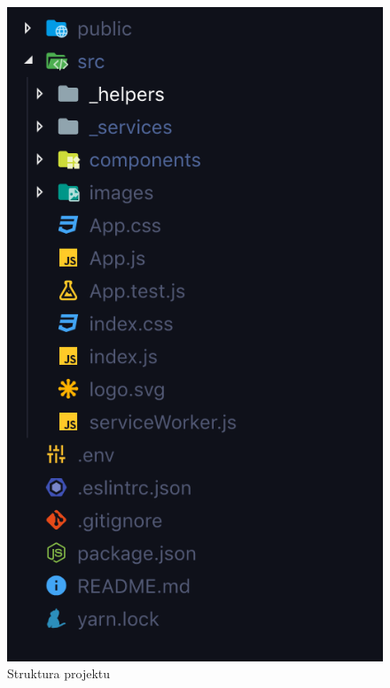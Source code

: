\documentclass[declaration,shortabstract]{iithesis}
\begin{document}
\begin{figure}
    \centering
    \includegraphics[]{images/forontend.png}  
    \caption{Struktura projektu}
    \label{fig:frontend_struct}
\end{figure}
\end{document}
